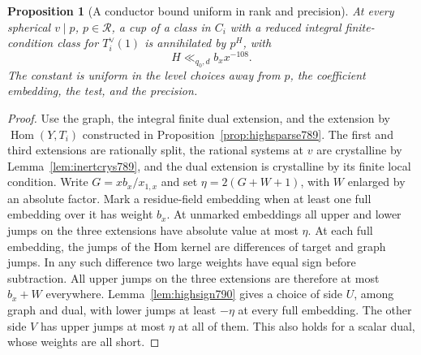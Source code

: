 \documentclass[a4paper,11pt]{article}
\newtheorem{proposition}{Proposition}[section]
\theoremstyle{definition}
\theoremstyle{remark}
\numberwithin{equation}{section}
\begin{document}
\begin{proposition}[A conductor bound uniform in rank and precision]
\leavevmode\label{prop:highram790}
At every spherical \(v\mid p\), \(p\in\mathcal R\), a cup of a
class in \(C_i\) with a reduced integral finite-condition
class for \(T_i^\vee(1)\) is annihilated by \(p^H\), with
\[
                        H\ll_{q_0,d} b_x x^{-108}.
\]
The constant is uniform in the level choices away from \(p\),
the coefficient embedding, the test, and the precision.
\end{proposition}
\begin{proof}
Use the graph, the integral finite dual extension, and the
extension by \(\operatorname{Hom}(Y,T_i)\) constructed in
Proposition~\ref{prop:highsparse789}. The first and third
extensions are rationally split, the rational systems at \(v\)
are crystalline by Lemma~\ref{lem:inertcrys789}, and the
dual extension is crystalline by its finite local condition.
Write \(G=xb_x/x_{1,x}\) and set \(\eta=2(G+W+1)\), with
\(W\) enlarged by an absolute factor. Mark a residue-field
embedding when at least one full embedding over it has weight
\(b_x\). At unmarked embeddings all upper and lower jumps
on the three extensions have absolute value at most \(\eta\).
At each full embedding, the jumps of the Hom kernel are
differences of target and graph jumps. In any such difference
two large weights have equal sign before subtraction.
All upper jumps on the three extensions are therefore at
most \(b_x+W\) everywhere. Lemma~\ref{lem:highsign790} gives
a choice of side \(U\), among graph and dual, with lower jumps
at least \(-\eta\) at every full embedding. The other side
\(V\) has upper jumps at most \(\eta\) at all of them. This
also holds for a scalar dual, whose weights are all short.


\end{proof}
\end{document}
